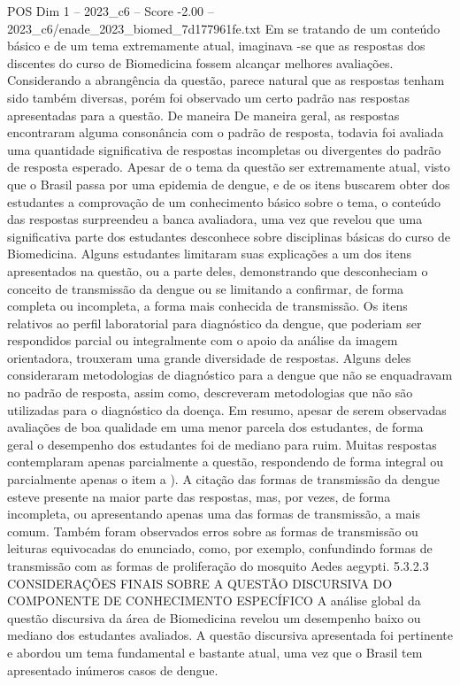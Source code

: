 \begin{textsample}{POS Dim 1 – 2023\_c6 – Score -2.00 – 2023\_c6/enade\_2023\_biomed\_7d177961fe.txt}
Em se tratando de um conteúdo básico e de um tema extremamente atual, imaginava -se que as respostas dos discentes do curso de Biomedicina fossem alcançar melhores avaliações.
Considerando a abrangência da questão, parece natural que as respostas tenham sido também diversas, porém foi observado um certo padrão nas respostas apresentadas para a questão.
De maneira De maneira geral, as respostas encontraram alguma consonância com o padrão de resposta, todavia foi avaliada uma quantidade significativa de respostas incompletas ou divergentes do padrão de resposta esperado.
Apesar de o tema da questão ser extremamente atual, visto que o Brasil passa por uma epidemia de dengue, e de os itens buscarem obter dos estudantes a comprovação de um conhecimento básico sobre o tema, o conteúdo das respostas surpreendeu a banca avaliadora, uma vez que revelou que uma significativa parte dos estudantes desconhece sobre disciplinas básicas do curso de Biomedicina.
Alguns estudantes limitaram suas explicações a um dos itens apresentados na questão, ou a parte deles, demonstrando que desconheciam o conceito de transmissão da dengue ou se limitando a confirmar, de forma completa ou incompleta, a forma mais conhecida de transmissão.
Os itens relativos ao perfil laboratorial para diagnóstico da dengue, que poderiam ser respondidos parcial ou integralmente com o apoio da análise da imagem orientadora, trouxeram uma grande diversidade de respostas.
Alguns deles consideraram metodologias de diagnóstico para a dengue que não se enquadravam no padrão de resposta, assim como, descreveram metodologias que não são utilizadas para o diagnóstico da doença.
Em resumo, apesar de serem observadas avaliações de boa qualidade em uma menor parcela dos estudantes, de forma geral o desempenho dos estudantes foi de mediano para ruim.
Muitas respostas contemplaram apenas parcialmente a questão, respondendo de forma integral ou parcialmente apenas o item a ).
A citação das formas de transmissão da dengue esteve presente na maior parte das respostas, mas, por vezes, de forma incompleta, ou apresentando apenas uma das formas de transmissão, a mais comum.
Também foram observados erros sobre as formas de transmissão ou leituras equivocadas do enunciado, como, por exemplo, confundindo formas de transmissão com as formas de proliferação do mosquito Aedes aegypti. 5.3.2.3 CONSIDERAÇÕES FINAIS SOBRE A QUESTÃO DISCURSIVA DO COMPONENTE DE CONHECIMENTO ESPECÍFICO A análise global da questão discursiva da área de Biomedicina revelou um desempenho baixo ou mediano dos estudantes avaliados.
A questão discursiva apresentada foi pertinente e abordou um tema fundamental e bastante atual, uma vez que o Brasil tem apresentado inúmeros casos de dengue.

\end{textsample}

